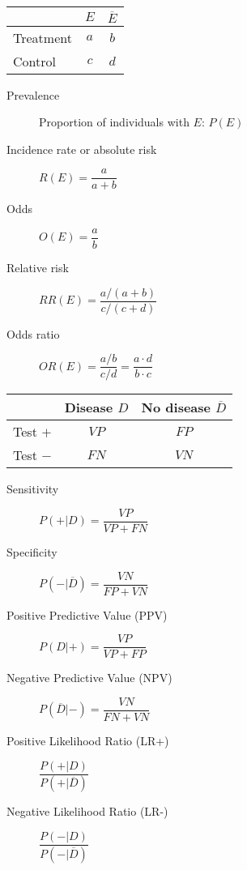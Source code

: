 \begin{multicols*}{2}
\begin{tcolorbox}[hbox, title=Risks]
\begin{minipage}{0.4\textwidth}
\begin{center}
\begin{tabular}{|l|c|c|}
\cline{2-3}
\multicolumn{1}{c|}{} & $E$ & $\overline E$ \\
\hline
Treatment             & $a$ & $b$           \\
\hline
Control               & $c$ & $d$           \\
\hline
\end{tabular}
\end{center}
\begin{description}
\item[Prevalence] Proportion of individuals with $E$: $P(E)$
\item[Incidence rate or absolute risk] $R(E)=\dfrac{a}{a+b}$
\item[Odds] $O(E)=\dfrac{a}{b}$
\item[Relative risk] $RR(E)=\dfrac{a/(a+b)}{c/(c+d)}$
\item[Odds ratio] $OR(E)=\dfrac{a/b}{c/d}=\dfrac{a\cdot d}{b\cdot c}$
\end{description}
\end{minipage}
\end{tcolorbox}


\begin{tcolorbox}[hbox, title=Diagnostic tests]
\begin{minipage}{0.4\textwidth}
\begin{center}
\begin{tabular}{|l|c|c|}
\cline{2-3}
\multicolumn{1}{c|}{} & Disease $D$ & No disease $\overline D$ \\
\hline
Test $+$              & $VP$        & $FP$                     \\
\hline
Test $-$              & $FN$        & $VN$                     \\
\hline
\end{tabular}
\end{center}
\begin{description}
\item[Sensitivity] $P(+|D)=\dfrac{VP}{VP+FN}$
\item[Specificity] $P(-|\overline{D})=\dfrac{VN}{FP+VN}$
\item[Positive Predictive Value (PPV)] $P(D|+)=\dfrac{VP}{VP+FP}$
\item[Negative Predictive Value (NPV)] $P(\overline{D}|-)=\dfrac{VN}{FN+VN}$
\item[Positive Likelihood Ratio (LR+)] $\dfrac{P(+|D)}{P(+|\overline{D})}$
\item[Negative Likelihood Ratio (LR-)] $\dfrac{P(-|D)}{P(-|\overline{D})}$
\end{description}
\end{minipage}
\end{tcolorbox}



\end{multicols*}
